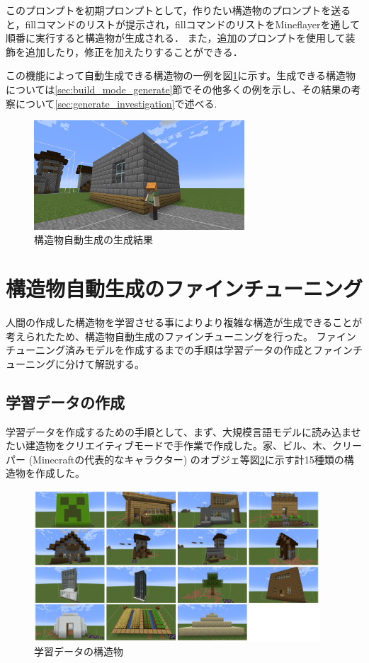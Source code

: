このプロンプトを初期プロンプトとして，作りたい構造物のプロンプトを送ると，fillコマンドのリストが提示され，fillコマンドのリストをMineflayerを通して順番に実行すると構造物が生成される．
また，追加のプロンプトを使用して装飾を追加したり，修正を加えたりすることができる．

この機能によって自動生成できる構造物の一例を図\ref{fig:generate_example}に示す。生成できる構造物については\ref{sec:build_mode_generate}節でその他多くの例を示し、その結果の考察について\ref{sec:generate_investigation}で述べる.

\begin{figure}[H]
    \centering
    \includegraphics[width=0.7\textwidth]{fig/generate_example.png}
    \caption{構造物自動生成の生成結果}
    \label{fig:generate_example}
\end{figure}



\section{構造物自動生成のファインチューニング}
人間の作成した構造物を学習させる事によりより複雑な構造が生成できることが考えられたため、構造物自動生成のファインチューニングを行った。
ファインチューニング済みモデルを作成するまでの手順は学習データの作成とファインチューニングに分けて解説する。

\subsection{学習データの作成}
学習データを作成するための手順として、まず、大規模言語モデルに読み込ませたい建造物をクリエイティブモードで手作業で作成した。家、ビル、木、クリーパー (Minecraftの代表的なキャラクター) のオブジェ等図\ref{fig:train_structure}に示す計15種類の構造物を作成した。

\begin{figure}[H]
    \centering
    \includegraphics[width=0.95\textwidth]{fig/train_data.PNG}
    \caption{学習データの構造物}
    \label{fig:train_structure}
\end{figure}

